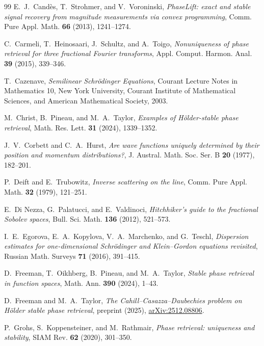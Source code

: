 \documentclass[11pt]{amsart}
\theoremstyle{remark}
\newcommand{\1}{\mathbf 1}
\begin{document}
\begin{thebibliography}{99}
E.~J.~Cand\`es, T.~Strohmer, and V.~Voroninski,
\emph{PhaseLift: exact and stable signal recovery from magnitude measurements via convex programming},
Comm. Pure Appl. Math. \textbf{66} (2013), 1241--1274.

C.~Carmeli, T.~Heinosaari, J.~Schultz, and A.~Toigo,
\emph{Nonuniqueness of phase retrieval for three fractional Fourier
transforms},
Appl. Comput. Harmon. Anal. \textbf{39} (2015), 339--346.

T.~Cazenave,
\emph{Semilinear Schr\"odinger Equations},
Courant Lecture Notes in Mathematics 10,
New York University, Courant Institute of Mathematical Sciences, and
American Mathematical Society, 2003.

M.~Christ, B.~Pineau, and M.~A.~Taylor,
\emph{Examples of H\"older-stable phase retrieval},
Math. Res. Lett. \textbf{31} (2024), 1339--1352.

J.~V.~Corbett and C.~A.~Hurst,
\emph{Are wave functions uniquely determined by their position and momentum distributions?},
J. Austral. Math. Soc. Ser. B \textbf{20} (1977), 182--201.

P.~Deift and E.~Trubowitz,
\emph{Inverse scattering on the line},
Comm. Pure Appl. Math. \textbf{32} (1979), 121--251.

E.~Di Nezza, G.~Palatucci, and E.~Valdinoci,
\emph{Hitchhiker's guide to the fractional Sobolev spaces},
Bull. Sci. Math. \textbf{136} (2012), 521--573.

I.~E.~Egorova, E.~A.~Kopylova, V.~A.~Marchenko, and G.~Teschl,
\emph{Dispersion estimates for one-dimensional Schr\"odinger and Klein--Gordon equations revisited},
Russian Math. Surveys \textbf{71} (2016), 391--415.

D.~Freeman, T.~Oikhberg, B.~Pineau, and M.~A.~Taylor,
\emph{Stable phase retrieval in function spaces},
Math. Ann. \textbf{390} (2024), 1--43.

D.~Freeman and M.~A.~Taylor,
\emph{The Cahill--Casazza--Daubechies problem on H\"older stable phase retrieval},
preprint (2025), \href{https://arxiv.org/abs/2512.08806}{arXiv:2512.08806}.

P.~Grohs, S.~Koppensteiner, and M.~Rathmair,
\emph{Phase retrieval: uniqueness and stability},
SIAM Rev. \textbf{62} (2020), 301--350.


\end{thebibliography}
\end{document}
